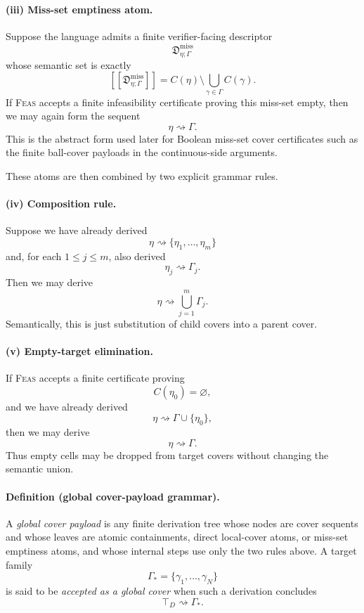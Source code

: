 \paragraph{(iii) Miss-set emptiness atom.}
Suppose the language admits a finite verifier-facing descriptor
\[
\mathfrak D^{\mathrm{miss}}_{\eta;\Gamma}
\]
whose semantic set is exactly
\[
[\![\mathfrak D^{\mathrm{miss}}_{\eta;\Gamma}]\!]
=
C(\eta)\setminus \bigcup_{\gamma\in\Gamma} C(\gamma).
\]
If \textsc{Feas} accepts a finite infeasibility certificate proving this miss-set empty, then we may again form the sequent
\[
\eta \rightsquigarrow \Gamma.
\]
This is the abstract form used later for Boolean miss-set cover certificates such as the finite ball-cover payloads in the continuous-side arguments.

These atoms are then combined by two explicit grammar rules.

\paragraph{(iv) Composition rule.}
Suppose we have already derived
\[
\eta \rightsquigarrow \{\eta_1,\dots,\eta_m\}
\]
and, for each $1\le j\le m$, also derived
\[
\eta_j \rightsquigarrow \Gamma_j.
\]
Then we may derive
\[
\eta \rightsquigarrow \bigcup_{j=1}^m \Gamma_j.
\]
Semantically, this is just substitution of child covers into a parent cover.

\paragraph{(v) Empty-target elimination.}
If \textsc{Feas} accepts a finite certificate proving
\[
C(\eta_0)=\varnothing,
\]
and we have already derived
\[
\eta \rightsquigarrow \Gamma\cup\{\eta_0\},
\]
then we may derive
\[
\eta \rightsquigarrow \Gamma.
\]
Thus empty cells may be dropped from target covers without changing the semantic union.

\paragraph{Definition (global cover-payload grammar).}
A \emph{global cover payload} is any finite derivation tree whose nodes are cover sequents and whose leaves are atomic containments, direct local-cover atoms, or miss-set emptiness atoms, and whose internal steps use only the two rules above. A target family
\[
\Gamma_\ast=\{\gamma_1,\dots,\gamma_N\}
\]
is said to be \emph{accepted as a global cover} when such a derivation concludes
\[
\top_D \rightsquigarrow \Gamma_\ast.
\]

